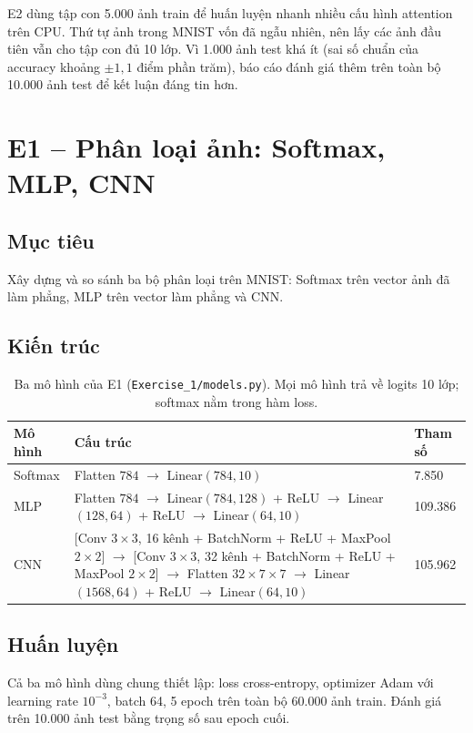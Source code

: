 \documentclass[12pt]{article}
\newcommand{\code}[1]{\texttt{#1}}
\begin{document}
E2 dùng tập con 5.000 ảnh train để huấn luyện nhanh nhiều cấu hình attention trên CPU. Thứ tự ảnh trong MNIST vốn đã ngẫu
nhiên, nên lấy các ảnh đầu tiên vẫn cho tập con đủ 10 lớp. Vì 1.000 ảnh test khá ít (sai số chuẩn của accuracy khoảng
$\pm 1{,}1$ điểm phần trăm), báo cáo đánh giá thêm trên toàn bộ 10.000 ảnh test để kết luận đáng tin hơn.

\section{E1 -- Phân loại ảnh: Softmax, MLP, CNN}
\subsection{Mục tiêu}
Xây dựng và so sánh ba bộ phân loại trên MNIST: Softmax trên vector ảnh đã làm phẳng, MLP trên vector làm phẳng và CNN.

\subsection{Kiến trúc}
\begin{table}[H]
\centering
\caption{Ba mô hình của E1 (\code{Exercise\_1/models.py}). Mọi mô hình trả về logits 10 lớp; softmax nằm trong hàm loss.}\label{tab:e1-models}
\begin{tabularx}{\linewidth}{@{}P{2cm}LR{2.2cm}@{}}
\toprule
Mô hình & Cấu trúc & Tham số \\\midrule
Softmax & Flatten $784$ $\rightarrow$ Linear$(784, 10)$ & 7.850 \\
MLP & Flatten $784$ $\rightarrow$ Linear$(784,128)$ + ReLU $\rightarrow$ Linear$(128,64)$ + ReLU $\rightarrow$ Linear$(64,10)$ & 109.386 \\
CNN & [Conv $3\times3$, 16 kênh + BatchNorm + ReLU + MaxPool $2\times2$] $\rightarrow$ [Conv $3\times3$, 32 kênh + BatchNorm + ReLU + MaxPool $2\times2$] $\rightarrow$ Flatten $32\times7\times7$ $\rightarrow$ Linear$(1568,64)$ + ReLU $\rightarrow$ Linear$(64,10)$ & 105.962 \\
\bottomrule
\end{tabularx}
\end{table}

\subsection{Huấn luyện}
Cả ba mô hình dùng chung thiết lập: loss cross-entropy, optimizer Adam với learning rate $10^{-3}$, batch 64, 5 epoch
trên toàn bộ 60.000 ảnh train. Đánh giá trên 10.000 ảnh test bằng trọng số sau epoch cuối.
\end{document}
